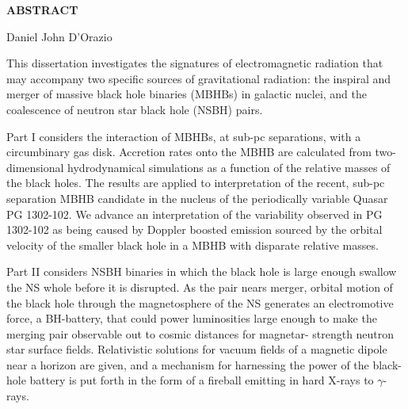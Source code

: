 \thispagestyle{empty}
\begin{center}

{\Large \bf ABSTRACT}

\vspace{.35in}
{\large \bf \thesistitle}

\vspace{.35in}

{\large Daniel John D'Orazio} \\
\vspace{.35in}
\end{center}
%

This dissertation investigates the signatures of electromagnetic radiation
that may accompany two specific sources of gravitational radiation: the
inspiral and merger of massive black hole binaries (MBHBs) in galactic
nuclei, and the coalescence of neutron star black hole (NSBH) pairs. 

Part I considers the interaction of MBHBs, at sub-pc separations, with a
circumbinary gas disk. Accretion rates onto the MBHB are calculated from two-dimensional 
hydrodynamical simulations as a function of the relative masses of
the black holes. The results are applied to interpretation of the recent, sub-pc 
separation MBHB candidate in the nucleus of the periodically variable
Quasar PG 1302-102. We advance an interpretation of the variability observed
in PG 1302-102 as being caused by Doppler boosted emission sourced by the
orbital velocity of the smaller black hole in a MBHB with disparate relative masses.

Part II considers NSBH binaries in which the black hole is large enough
swallow the NS whole before it is disrupted. As the pair nears merger, orbital
motion of the black hole through the magnetosphere of the NS generates an
electromotive force, a BH-battery, that could power luminosities large enough
to make the merging pair observable out to cosmic distances for magnetar-
strength neutron star surface fields. Relativistic solutions for vacuum fields
of a magnetic dipole near a horizon are given, and a mechanism for harnessing
the power of the black-hole battery is put forth in the form of a fireball emitting in 
hard X-rays to $\gamma$-rays.
